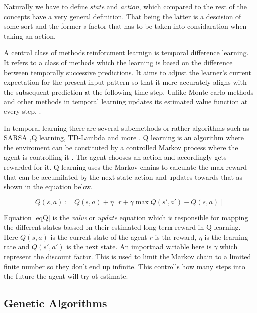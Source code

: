 Naturally we have to define \textit{state} and \textit{action}, which compared to the rest of the concepts have a very general definition. That being the latter is a descision of some sort and the former a factor that has to be taken into considaration when taking an action. 

A central class of methods reinforcment learnign is temporal difference learning. It refers to a class of methods which the learning is based on the difference between temporally successive predictions. It aims to adjust the learner's current expectation for the present input pattern so that it more accurately aligns with the subsequent prediction at the following time step. Unlike Monte carlo methods and other methods in temporal learning updates its estimated value function at every step. \cite{tesauro1995temporal}. 

In temporal learning there are several subcmethods or rather algorithms such as SARSA ,Q learning, TD-Lambda and more \cite{eiben2007reinforcement}. Q learning is an algorithm where the enviroment can be constituted by a controlled Markov process where the agent is controlling it \cite{watkins1992q}. The agent chooses an action and accordingly gets rewarded for it. Q-learning uses the Markov chains to calculate the max reward that can be accumilated by the next state action and updates towards that as shown in the equation below.

\begin{equation} \label{eqQ}
    { Q(s,a) := Q(s,a) + \eta [r + \gamma \max Q(s',a') - Q(s,a)]}
\end{equation}

Equation \ref{eqQ} is the \textit{value} or \textit{update} equation which is responsible for mapping the different states bassed on their estimated long term reward in Q learning. Here $Q(s,a)$ is the current state of the agent $r$ is the reward, $\eta$ is the learning rate and $Q(s',a')$ is the next state. An importnad variable here is $\gamma$ which represent the discount factor. This is used to limit the Markov chain to a limited finite number so they don't end up infinite. This controlls how many steps into the future the agent will try ot estimate. 


\subsection{Genetic Algorithms}

